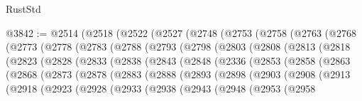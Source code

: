 \begin{lexlean}{RustStd}
\begin{coremodule}
@3842 := @2514
    (@2518
      (@2522
        (@2527
          (@2748
            (@2753
              (@2758
                (@2763
                  (@2768
                    (@2773
                      (@2778
                        (@2783
                          (@2788
                            (@2793
                              (@2798
                                (@2803
                                  (@2808
                                    (@2813
                                      (@2818
                                        (@2823
                                          (@2828
                                            (@2833
                                              (@2838
                                                (@2843
                                                  (@2848
                                                    (@2336
                                                      (@2853
                                                        (@2858
                                                          (@2863
                                                            (@2868
                                                              (@2873
                                                                (@2878
                                                                  (@2883
                                                                    (@2888
                                                                      (@2893
                                                                        (@2898
                                                                          (@2903
                                                                            (@2908
                                                                              (@2913
                                                                                (@2918
                                                                                  (@2923
                                                                                    (@2928
                                                                                      (@2933
                                                                                        (@2938
                                                                                          (@2943
                                                                                            (@2948
                                                                                              (@2953
                                                                                                (@2958

\end{coremodule}
\end{lexlean}
